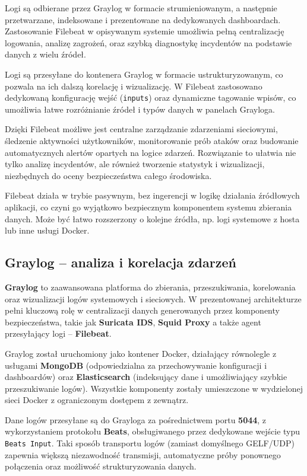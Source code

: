\documentclass[
    left=2.5cm,         %
    right=2.5cm,        %
    top=2.5cm,          %
    bottom=3cm,         %
    bindingoffset=6mm,  %
    nohyphenation=true %
]{eiti/eiti-thesis} %
\begin{document}
Logi są odbierane przez Graylog w formacie strumieniowanym, a następnie przetwarzane, indeksowane i prezentowane na dedykowanych dashboardach. Zastosowanie Filebeat w opisywanym systemie umożliwia pełną centralizację logowania, analizę zagrożeń, oraz szybką diagnostykę incydentów na podstawie danych z wielu źródeł.



Logi są przesyłane do kontenera Graylog w formacie ustrukturyzowanym, co pozwala na ich dalszą korelację i wizualizację. W Filebeat zastosowano dedykowaną konfigurację wejść (\texttt{inputs}) oraz dynamiczne tagowanie wpisów, co umożliwia łatwe rozróżnianie źródeł i typów danych w panelach Grayloga.

Dzięki Filebeat możliwe jest centralne zarządzanie zdarzeniami sieciowymi, śledzenie aktywności użytkowników, monitorowanie prób ataków oraz budowanie automatycznych alertów opartych na logice zdarzeń. Rozwiązanie to ułatwia nie tylko analizę incydentów, ale również tworzenie statystyk i wizualizacji, niezbędnych do oceny bezpieczeństwa całego środowiska.

Filebeat działa w trybie pasywnym, bez ingerencji w logikę działania źródłowych aplikacji, co czyni go wyjątkowo bezpiecznym komponentem systemu zbierania danych. Może być łatwo rozszerzony o kolejne źródła, np. logi systemowe z hosta lub inne usługi Docker.

\subsection{Graylog – analiza i korelacja zdarzeń}

\textbf{Graylog}\cite{graylog-docs} to zaawansowana platforma do zbierania, przeszukiwania, korelowania oraz wizualizacji logów systemowych i sieciowych. W prezentowanej architekturze pełni kluczową rolę w centralizacji danych generowanych przez komponenty bezpieczeństwa, takie jak \textbf{Suricata IDS}, \textbf{Squid Proxy} a także agent przesyłający logi – \textbf{Filebeat}.

Graylog został uruchomiony jako kontener Docker, działający równolegle z usługami \textbf{MongoDB} (odpowiedzialna za przechowywanie konfiguracji i dashboardów) oraz \textbf{Elasticsearch} (indeksujący dane i umożliwiający szybkie przeszukiwanie logów). Wszystkie komponenty zostały umieszczone w wydzielonej sieci Docker z ograniczonym dostępem z zewnątrz.

Dane logów przesyłane są do Grayloga za pośrednictwem portu \textbf{5044}, z wykorzystaniem protokołu \textbf{Beats}, obsługiwanego przez dedykowane wejście typu \texttt{Beats Input}. Taki sposób transportu logów (zamiast domyślnego GELF/UDP) zapewnia większą niezawodność transmisji, automatyczne próby ponownego połączenia oraz możliwość strukturyzowania danych.
\end{document}
